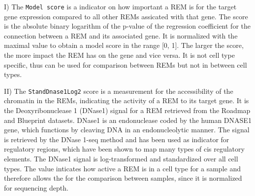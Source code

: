 \documentclass[pdftex,12pt,a4paper]{report}
\begin{document}
I) The \texttt{Model score} is a indicator on how important a REM is for the target gene expression compared to all other REMs assicated with that gene. The score is the absolute binary logarithm of the p-value of the regression coefficient for the connection between a REM and its associated gene. It is normalized with the maximal value to obtain a model score in the range [0, 1]. The larger the score, the more impact the REM has on the gene and vice versa. It is not cell type specific, thus can be used for comparison between REMs but not in between cell types.

II) The \texttt{StandDnase1Log2} score is a measurement for the accessibility of the chromatin in the REMs, indicating the activity of a REM to its target gene. It is the Deoxyribonuclease 1 (DNase1) signal for a REM retrieved from the Roadmap\cite{roadmap} and Blueprint\cite{blueprint} datasets. DNase1 is an endonuclease coded by the human DNASE1 gene, which functions by cleaving DNA in an endonucleolytic manner\cite{dnase_nih}. The signal is retrieved by the DNase 1-seq method\cite{dnase_method} and has been used as indicator for regulatory regions, which have been shown to map many types of cis regulatory elements. The DNase1 signal is log-transformed and standardized over all cell types\cite{dnase_cis}. The value inticates how active a REM is in a cell type for a sample and therefore allows the for the comparison between samples, since it is normalized for sequencing depth. 
\end{document}

